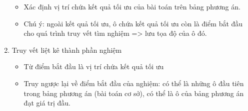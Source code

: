 \begin{enumerate}
\begin{itemize}
            \item Xác định vị trí chứa kết quả tối ưu của bài toán trên bảng phương án.
            \item Chú ý: ngoài kết quả tối ưu, ô chứa kết quả tối ưu còn là điểm bắt đầu cho quá trình truy vết tìm nghiệm => lưu tọa độ của ô đó.
        \end{itemize}
    \item Truy vết liệt kê thành phần nghiệm
        \begin{itemize}
            \item Từ điểm bắt đầu là vị trí chứa kết quả tối ưu
            \item Truy ngược lại về điểm bắt đầu của nghiệm: có thể là những ô đầu tiên trong bảng phương án (bài toán cơ sở), có thể là ô của bảng phương án đạt giá trị đầu.
        \end{itemize}
\end{enumerate}

